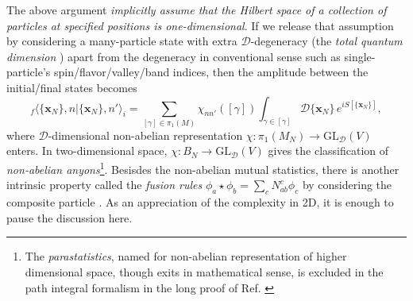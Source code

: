 \begin{itemize}
            The above argument \emph{implicitly assume that the Hilbert space of a collection of particles at specified positions is one-dimensional}. If we release that assumption by considering a many-particle state with extra $\mathcal D$-degeneracy (the \emph{total quantum dimension} \cite{kitaev2006topological}\cite{levin2006detecting}) apart from the degeneracy in conventional sense such as single-particle's spin/flavor/valley/band indices, then the amplitude between the initial/final states becomes
            \begin{equation*}
                _f\langle\{\bm x_N\},n|\{\bm x_N\},n'\rangle_i=\sum_{[\gamma]\in\pi_1(M)}\chi_{nn'}([\gamma])\int_{\gamma\in[\gamma]}\mathcal D\{\bm x_N\}\, e^{iS[\{\bm x_N\}]},
            \end{equation*}
            where $\mathcal D$-dimensional non-abelian representation $\chi:\pi_1(M_N)\rightarrow\mathrm{GL}_{\mathcal D}(V)$ enters. In two-dimensional space, $\chi: B_N\rightarrow\mathrm{GL}_{\mathcal D}(V)$ gives the classification of \emph{non-abelian anyons}\footnote{The \emph{parastatistics}, named for non-abelian representation of higher dimensional space, though exits in mathematical sense, is excluded in the path integral formalism in the long proof of Ref. \cite{laidlaw1971feynman}}. Besisdes the non-abelian mutual statistics, there is another intrinsic property called the \emph{fusion rules} $\phi_a\star\phi_b=\sum_c N^c_{ab}\phi_c$ by considering the composite particle . As an appreciation of the complexity in 2D, it is enough to pause the discussion here.


\end{itemize}
